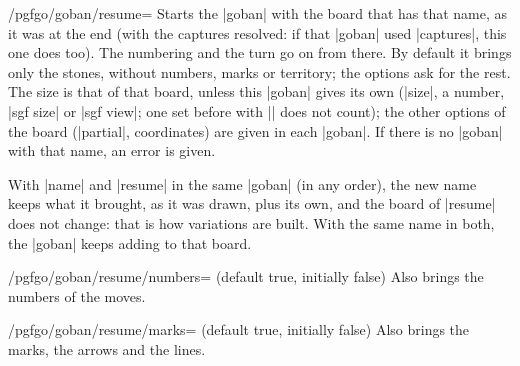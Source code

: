 	\begin{key}{/pgfgo/goban/resume=}
		Starts the |goban| with the board that has that name, as it was at the end (with the captures resolved: if that |goban| used |captures|, this one does too). The numbering and the turn go on from there. By default it brings only the stones, without numbers, marks or territory; the options ask for the rest. The size is that of that board, unless this |goban| gives its own (|size|, a number, |sgf size| or |sgf view|; one set before with |\pgfgoset| does not count); the other options of the board (|partial|, coordinates) are given in each |goban|. If there is no |goban| with that name, an error is given.

		With |name| and |resume| in the same |goban| (in any order), the new name keeps what it brought, as it was drawn, plus its own, and the board of |resume| does not change: that is how variations are built. With the same name in both, the |goban| keeps adding to that board.

		\begin{codeexample}[]

			\begin{goban}[name = base]
			\end{goban}

			\begin{goban}[name = variation1, resume = base]
			\end{goban}

			\begin{goban}[name = variation2, resume = base]
			\end{goban}

			\begin{goban}[resume = {variation1, numbers}]
			\end{goban}
		\end{codeexample}
	\end{key}

	\begin{key}{/pgfgo/goban/resume/numbers= (default true, initially false)}
		Also brings the numbers of the moves.
	\end{key}

	\begin{key}{/pgfgo/goban/resume/marks= (default true, initially false)}
		Also brings the marks, the arrows and the lines.
	\end{key}

